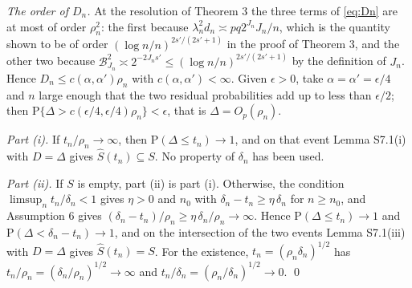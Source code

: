 \documentclass[10pt]{book}
\theoremstyle{definition}
\newcommand{\Prob}{\mathrm{P}}
\newcommand{\penn}{\lambda_{n}}
\newcommand{\seff}{s'}
\begin{document}
{\emph{The order of $D_n$.} At the resolution of Theorem 3 the three terms of
\eqref{eq:Dn} are at most of order $\rho_n^2$: the first because
$\penn^2d_n \asymp pq2^{J_n}J_n/n$, which is the quantity shown to be of order
$(\log n/n)^{2\seff/(2\seff+1)}$ in the proof of Theorem 3, and the other two
because $\mathcal{B}^2_{J_n} \asymp 2^{-2J_n\seff} \le
(\log n/n)^{2\seff/(2\seff+1)}$ by the definition of $J_n$. Hence
$D_n \le c(\alpha,\alpha')\rho_n$ with $c(\alpha,\alpha') < \infty$. Given $\epsilon > 0$,
take $\alpha = \alpha' = \epsilon/4$ and $n$ large enough that the two
residual probabilities add up to less than $\epsilon/2$; then
$\Prob\{\Delta > c(\epsilon/4,\epsilon/4)\rho_n\} < \epsilon$, that is
$\Delta = O_p(\rho_n)$.

\emph{Part (i).} If $t_n/\rho_n \to \infty$, then
$\Prob(\Delta \le t_n) \to 1$, and on that event Lemma S7.1(i) with
$D = \Delta$ gives $\widehat{S}(t_n) \subseteq S$. No property of $\delta_n$
has been used.

\emph{Part (ii).} If $S$ is empty, part (ii) is part (i). Otherwise, the
condition $\limsup_n t_n/\delta_n < 1$ gives $\eta > 0$ and $n_0$ with
$\delta_n - t_n \ge \eta\,\delta_n$ for $n \ge n_0$, and Assumption 6 gives
$(\delta_n - t_n)/\rho_n \ge \eta\,\delta_n/\rho_n \to \infty$. Hence
$\Prob(\Delta \le t_n) \to 1$ and $\Prob(\Delta < \delta_n - t_n) \to 1$, and
on the intersection of the two events Lemma S7.1(iii) with $D = \Delta$ gives
$\widehat{S}(t_n) = S$. For the existence, $t_n = (\rho_n\delta_n)^{1/2}$ has
$t_n/\rho_n = (\delta_n/\rho_n)^{1/2} \to \infty$ and
$t_n/\delta_n = (\rho_n/\delta_n)^{1/2} \to 0$. \qed
}

\bibhang=1.7pc
\bibsep=2pt
\fontsize{9}{14pt plus.8pt minus .6pt}\selectfont
\renewcommand\bibname{\large \bf References}


\end{document}
